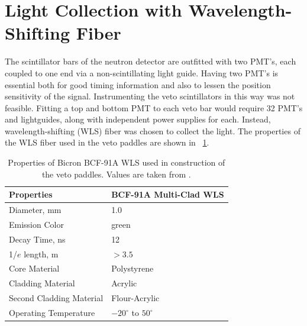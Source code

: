 \section{Light Collection with Wavelength-Shifting Fiber}

The scintillator bars of the neutron detector are outfitted with two PMT's, each coupled to one end via a non-scintillating light guide.  Having two PMT's is essential both for good timing information and also to lessen the position sensitivity of the signal.  Instrumenting the veto scintillators in this way was not feasible.  Fitting a top and bottom PMT to each veto bar would require 32 PMT's and lightguides, along with independent power supplies for each.  Instead, wavelength-shifting (WLS) fiber was chosen to collect the light.  The properties of the WLS fiber used in the veto paddles are shown in {\tab}~\ref{tab:WLS_Kuraray}.
\begin{table}[htp]
\centering
\begin{tabular}{ll}
Properties & BCF-91A Multi-Clad WLS \\
\hline
Diameter, mm & 1.0 \\
Emission Color & green \\
Decay Time, ns & 12 \\
1/$e$ length, m & $>3.5$ \\
Core Material & Polystyrene \\
Cladding Material & Acrylic \\
Second Cladding Material & Flour-Acrylic \\
Operating Temperature & $-20^{\circ}$ to $50^{\circ}$ \\
\end{tabular}
\caption{Properties of Bicron BCF-91A WLS used in construction of the veto paddles.  Values are taken from \cite{BCF-91A}.}
\label{tab:WLS_Kuraray}
\end{table}

